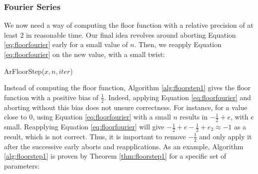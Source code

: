 \documentclass[runningheads]{llncs}
\begin{document}
\subsubsection{Fourier Series}
We now need a way of computing the floor function with a relative precision of at least $2$ in reasonable time. Our final idea revolves around aborting Equation \ref{eq:floorfourier} early for a small value of $n$. Then, we reapply Equation \ref{eq:floorfourier} on the new value, with a small twist:

\begin{algorithm}[H]
  \caption{ArFloorStep($x,n,iter$)}
  \label{alg:floorstep1}
\end{algorithm}
Instead of computing the floor function, Algorithm \ref{alg:floorstep1} gives the floor function with a positive bias of $\frac{1}{2}$. Indeed, applying Equation \ref{eq:floorfourier} and aborting without this bias does not unsure correctness. For instance, for a value close to $0$, using Equation \ref{eq:floorfourier} with a small $n$ results in $-\frac{1}{2} + e$, with $e$ small. Reapplying Equation \ref{eq:floorfourier} will give $-\frac{1}{2}+e-\frac{1}{2}+e_2 \approx -1$ as a result, which is not correct. Thus, it is important to remove $-\frac{1}{2}$ and only apply it after the successive early aborts and reapplications. As an example, Algorithm \ref{alg:floorstep1} is proven by Theorem \ref{thm:floorstep1} for a specific set of parameters:
\end{document}
